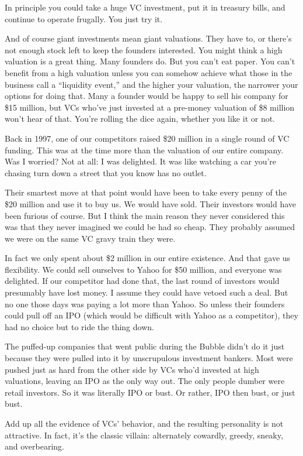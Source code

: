 \documentclass[12pt]{book}
\begin{document}
In principle you could take a huge VC investment, put it in treasury
bills, and continue to operate frugally. You just try it.

And of course giant investments mean giant valuations. They have to, or
there's not enough stock left to keep the founders interested. You might
think a high valuation is a great thing. Many founders do. But you can't
eat paper. You can't benefit from a high valuation unless you can
somehow achieve what those in the business call a ``liquidity event,''
and the higher your valuation, the narrower your options for doing that.
Many a founder would be happy to sell his company for \$15 million, but
VCs who've just invested at a pre-money valuation of \$8 million won't
hear of that. You're rolling the dice again, whether you like it or not.

Back in 1997, one of our competitors raised \$20 million in a single
round of VC funding. This was at the time more than the valuation of our
entire company. Was I worried? Not at all: I was delighted. It was like
watching a car you're chasing turn down a street that you know has no
outlet.

Their smartest move at that point would have been to take every penny of
the \$20 million and use it to buy us. We would have sold. Their
investors would have been furious of course. But I think the main reason
they never considered this was that they never imagined we could be had
so cheap. They probably assumed we were on the same VC gravy train they
were.

In fact we only spent about \$2 million in our entire existence. And
that gave us flexibility. We could sell ourselves to Yahoo for \$50
million, and everyone was delighted. If our competitor had done that,
the last round of investors would presumably have lost money. I assume
they could have vetoed such a deal. But no one those days was paying a
lot more than Yahoo. So unless their founders could pull off an IPO
(which would be difficult with Yahoo as a competitor), they had no
choice but to ride the thing down.

The puffed-up companies that went public during the Bubble didn't do it
just because they were pulled into it by unscrupulous investment
bankers. Most were pushed just as hard from the other side by VCs who'd
invested at high valuations, leaving an IPO as the only way out. The
only people dumber were retail investors. So it was literally IPO or
bust. Or rather, IPO then bust, or just bust.

Add up all the evidence of VCs' behavior, and the resulting personality
is not attractive. In fact, it's the classic villain: alternately
cowardly, greedy, sneaky, and overbearing.
\end{document}
